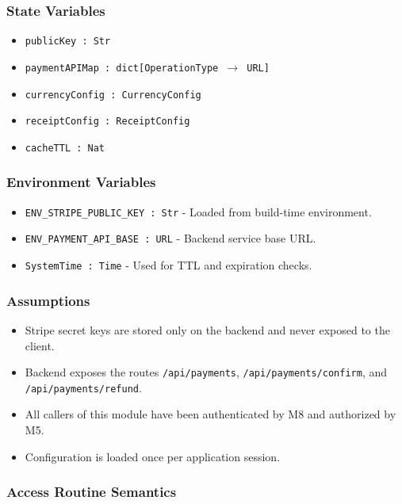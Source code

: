 \documentclass[12pt, titlepage]{article}
\begin{document}
\subsubsection{State Variables}

\begin{itemize}
    \item \texttt{publicKey : Str}
    \item \texttt{paymentAPIMap : dict[OperationType $\rightarrow$ URL]}
    \item \texttt{currencyConfig : CurrencyConfig}
    \item \texttt{receiptConfig : ReceiptConfig}
    \item \texttt{cacheTTL : Nat}
\end{itemize}

\subsubsection{Environment Variables}

\begin{itemize}
    \item \texttt{ENV\_STRIPE\_PUBLIC\_KEY : Str} - Loaded from build-time environment.
    \item \texttt{ENV\_PAYMENT\_API\_BASE : URL} - Backend service base URL.
    \item \texttt{SystemTime : Time} - Used for TTL and expiration checks.
\end{itemize}

\subsubsection{Assumptions}

\begin{itemize}
    \item Stripe secret keys are stored only on the backend and never exposed to the client.
    \item Backend exposes the routes \texttt{/api/payments}, 
    \texttt{/api/payments/confirm}\allowbreak, and \texttt{/api/payments/refund}.
    \item All callers of this module have been authenticated by M8 and authorized by M5.
    \item Configuration is loaded once per application session.
\end{itemize}

\subsubsection{Access Routine Semantics}
\end{document}
